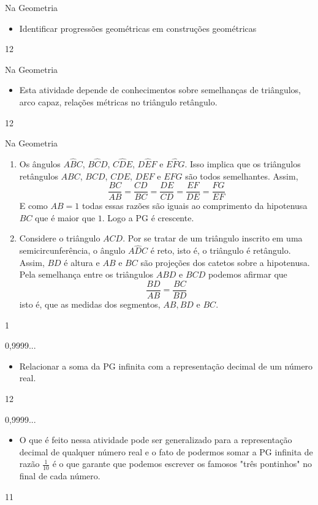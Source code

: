 \clearpage
\def\currentcolor{session2}
\begin{objectives}{Na Geometria}
{
\begin{itemize}
\item Identificar progressões geométricas em construções geométricas

\end{itemize}
}{1}{2}
\end{objectives}
\begin{sugestions}{Na Geometria}
{
\begin{itemize}
\item Esta atividade depende de conhecimentos sobre semelhanças de triângulos, arco capaz, relações métricas no triângulo retângulo.

\end{itemize}
}{1}{2}
\end{sugestions}
\begin{answer}{Na Geometria}
{
\begin{enumerate}
\item {} Os ângulos $A\hat{B}C$, $B\hat{C}D$, $C\hat{D}E$, $D\hat{E}F$ e $E\hat{F}G$. Isso implica que os triângulos retângulos $ABC$, $BCD$, $CDE$, $DEF$ e $EFG$ são todos semelhantes. Assim,
\[
\dfrac{BC}{AB}=\dfrac{CD}{BC}=\dfrac{DE}{CD}=\dfrac{EF}{DE}=\dfrac{FG}{EF}
\]
E como $AB=1$ todas essas razões são iguais ao comprimento da hipotenusa $BC$ que é maior que $1$. Logo a PG é crescente.
\item Considere o triângulo $ACD$. Por se tratar de um triângulo inscrito em uma semicircunferência, o ângulo $A\hat{D}C$ é reto, isto é, o triângulo é retângulo. Assim, $BD$ é altura e $AB$ e $BC$ são projeções dos catetos sobre a hipotenusa. Pela semelhança entre os triângulos $ABD$ e $BCD$ podemos afirmar que
\[
\dfrac{BD}{AB}=\dfrac{BC}{BD}
\]
isto é, que as medidas dos segmentos, $AB, BD$ e $BC$.
\end{enumerate}
}{1}
\end{answer}
\begin{objectives}{0,9999...}
{
\begin{itemize}
\item Relacionar a soma da PG infinita com a representação decimal de um número real.

\end{itemize}
}{1}{2}
\end{objectives}
\clearmargin
\begin{sugestions}{0,9999...}
{
\begin{itemize}
\item O que é feito nessa atividade pode ser generalizado para a representação decimal de qualquer número real e o fato de podermos somar a PG infinita de razão $\frac 1{10}$ é o que garante que podemos escrever os famosos "três pontinhos" no final de cada número.
\end{itemize}
}{1}{1}
\end{sugestions}
